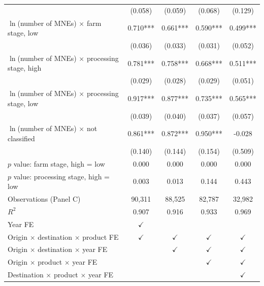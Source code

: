 \begin{tabular}{l*{4}{c}}
 & (0.058) & (0.059) & (0.068) & (0.129) \\
$\ln$(number of MNEs) $\times$ farm stage, low & 0.710*** & 0.661*** & 0.590*** & 0.499*** \\
 & (0.036) & (0.033) & (0.031) & (0.052) \\
$\ln$(number of MNEs) $\times$ processing stage, high & 0.781*** & 0.758*** & 0.668*** & 0.511*** \\
 & (0.029) & (0.028) & (0.029) & (0.051) \\
$\ln$(number of MNEs) $\times$ processing stage, low & 0.917*** & 0.877*** & 0.735*** & 0.565*** \\
 & (0.039) & (0.040) & (0.037) & (0.057) \\
$\ln$(number of MNEs) $\times$ not classified & 0.861*** & 0.872*** & 0.950*** & -0.028 \\
 & (0.140) & (0.144) & (0.154) & (0.509) \\
$p$ value: farm stage, high = low & 0.000 & 0.000 & 0.000 & 0.000 \\
$p$ value: processing stage, high = low & 0.003 & 0.013 & 0.144 & 0.443 \\
Observations (Panel C) & 90,311 & 88,525 & 82,787 & 32,982 \\
$R^2$ & 0.907 & 0.916 & 0.933 & 0.969 \\
\midrule
Year FE & $\checkmark$ &  &  &  \\
Origin $\times$ destination $\times$ product FE & $\checkmark$ & $\checkmark$ & $\checkmark$ & $\checkmark$ \\
Origin $\times$ destination $\times$ year FE &  & $\checkmark$ & $\checkmark$ & $\checkmark$ \\
Origin $\times$ product $\times$ year FE &  &  & $\checkmark$ & $\checkmark$ \\
Destination $\times$ product $\times$ year FE &  &  &  & $\checkmark$ \\
\bottomrule
\end{tabular}
